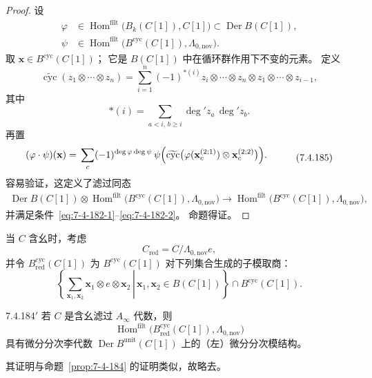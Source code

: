 \begin{proof}
设
\[
\begin{aligned}
\varphi&\in
\operatorname{Hom}^{\mathrm{filt}}
\bigl(B_k(C[1]),C[1]\bigr)
\subset\operatorname{Der}B(C[1]),\\
\psi&\in
\operatorname{Hom}^{\mathrm{filt}}
\bigl(B^{\mathrm{cyc}}(C[1]),\Lambda_{0,\mathrm{nov}}\bigr).
\end{aligned}
\]
取 $\mathbf x\in B^{\mathrm{cyc}}(C[1])$；
它是 $B(C[1])$ 中在循环群作用下不变的元素。
定义
\[
\widetilde{\operatorname{cyc}}
(z_1\otimes\cdots\otimes z_n)
=
\sum_{i=1}^{n}(-1)^{\ast(i)}
z_i\otimes\cdots\otimes z_n
\otimes z_1\otimes\cdots\otimes z_{i-1},
\]
其中
\[
\ast(i)
=\sum_{a<i,\,b\geq i}
\deg' z_a\,\deg' z_b.
\]
再置
\begin{equation}
\begin{aligned}
(\varphi\mathbin{\cdot}\psi)(\mathbf x)
={}&\sum_c(-1)^{\deg\varphi\deg\psi}\,
\psi\Bigl(
\widetilde{\operatorname{cyc}}
\bigl(
\varphi(\mathbf x_c^{(2;1)})
\otimes\mathbf x_c^{(2;2)}
\bigr)
\Bigr).
\end{aligned}
\tag{7.4.185}\label{eq:7-4-185}
\end{equation}
容易验证，这定义了滤过同态
\[
\begin{aligned}
\operatorname{Der}B(C[1])\otimes
\operatorname{Hom}^{\mathrm{filt}}
\bigl(B^{\mathrm{cyc}}(C[1]),\Lambda_{0,\mathrm{nov}}\bigr)
\longrightarrow
\operatorname{Hom}^{\mathrm{filt}}
\bigl(B^{\mathrm{cyc}}(C[1]),\Lambda_{0,\mathrm{nov}}\bigr),
\end{aligned}
\]
并满足条件~\eqref{eq:7-4-182-1}--\eqref{eq:7-4-182-2}。
命题得证。
\end{proof}

当 $C$ 含幺时，考虑
\[
C_{\mathrm{red}}=C/\Lambda_{0,\mathrm{nov}}e,
\]
并令 $B_{\mathrm{red}}^{\mathrm{cyc}}(C[1])$
为 $B^{\mathrm{cyc}}(C[1])$ 对下列集合生成的子模取商：
\[
\left\{
\left.
\sum_{\mathbf x_1,\mathbf x_2}
\mathbf x_1\otimes e\otimes\mathbf x_2
\,\right|\,
\mathbf x_1,\mathbf x_2\in B(C[1])
\right\}
\cap B^{\mathrm{cyc}}(C[1]).
\]

\begin{proposition}{7.4.184$'$}\label{prop:7-4-184-prime}
若 $C$ 是含幺滤过 $A_\infty$ 代数，则
\[
\operatorname{Hom}^{\mathrm{filt}}
\bigl(B_{\mathrm{red}}^{\mathrm{cyc}}(C[1]),
\Lambda_{0,\mathrm{nov}}\bigr)
\]
具有微分分次李代数
$\operatorname{Der}B^{\mathrm{unit}}(C[1])$
上的（左）微分分次模结构。
\end{proposition}

其证明与命题~\ref{prop:7-4-184} 的证明类似，故略去。

